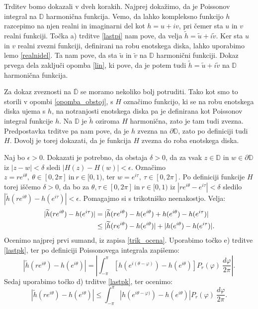\documentclass[mat1]{fmfdelo}
\begin{document}
     \begin{dokaz}
        Trditev bomo dokazali v dveh korakih. Najprej dokažimo, da je Poissonov integral na $\mathbb{D}$ harmonična funkcija.
        Vemo, da lahko kompleksno funkcijo $h$ razcepimo na njen realni in imaginarni del kot $h = u + iv$, pri čemer sta $u$ in $v$ realni funkciji. 
        Točka a) trditve \ref{lastpi} nam pove, da velja $\widetilde{h} = \widetilde{u} + i \widetilde{v}$.
        Ker sta $u$ in $v$ realni zvezni funkciji, definirani na robu enotskega diska, lahko uporabimo lemo \ref{realnidel}. Ta nam pove, da sta $\widetilde{u}$ in $\widetilde{v}$ na $\mathbb{D}$ harmonični funkciji. 
        Dokaz prvega dela zaključi opomba \ref{lin}, ki pove, da je potem tudi $\widetilde{h} = \widetilde{u} + i \widetilde{v}$ na $\mathbb{D}$ harmonična funkcija.
        
        Za dokaz zveznosti na $\overline{\mathbb{D}}$ se moramo nekoliko bolj potruditi. Tako kot smo to storili v opombi \ref{opomba_obstoj}, s $H$ označimo funkcijo, ki se na robu enotskega diska ujema s $h$, na notranjosti enotskega diska pa je definirana kot Poissonov integral funkcije $h$. 
        Na  $\mathbb{D}$ je $\widetilde{h}$ oziroma $H$ harmonična, zato je tam tudi zvezna. Predpostavka trditve pa nam pove, da je $h$ zvezna na $\partial \mathbb{D}$, zato po definiciji tudi $H$. 
        Dovolj je torej dokazati, da je funkcija $H$ zvezna do roba enotskega diska.
        
        Naj bo $\epsilon >0$. Dokazati je potrebno, da obstaja $\delta >0$, da za vsak $z \in \mathbb{D}$ in $w \in \partial \mathbb{D}$ iz $|z - w| < \delta$ sledi $|H(z) - H(w)| < \epsilon$. 
        Označimo $z = r e^{i \theta},~\theta \in [0,2\pi]~\text{in}~r \in [0,1)$, ter $w = e^{i \tau},~\tau \in [0,2\pi]$.
        Po definiciji funkcije $H$ torej iščemo $\delta >0$, da bo za $\theta, \tau \in [0,2\pi]~\text{in}~r \in [0,1)$ iz $|r e^{i \theta} - e^{i\tau}| < \delta$ sledilo $|\widetilde{h}(r e^{i \theta}) - h(e^{i\tau})| < \epsilon$.
        Pomagajmo si s trikotniško neenakostjo. Velja:
        \begin{align}
            \label{trik_ocena}
            |\widetilde{h}(r e^{i \theta}) - h(e^{i\tau})| &= |\widetilde{h}(r e^{i \theta}) - h(e^{i \theta}) + h(e^{i \theta}) - h(e^{i\tau})| \notag \\
            &\leq |\widetilde{h}(r e^{i \theta}) - h(e^{i\theta})| + |h(e^{i\theta}) - h(e^{i\tau})|.
        \end{align}
        Ocenimo najprej prvi sumand, iz zapisa \eqref{trik_ocena}. Uporabimo točko e) trditve \ref{lastpk}, ter po definiciji Poissonovega integrala zapišemo: 
        $$
            \left|\widetilde{h}(r e^{i \theta}) - h(e^{i\theta})\right| = \left|\int_{-\pi}^{\pi}{\left[h\left(e^{i(\theta - \varphi)}\right) - h\left(e^{i\theta}\right)\right]P_r(\varphi)~\frac{d\varphi}{2 \pi}}\right|.
        $$
        Sedaj uporabimo točko d) trditve \ref{lastpk}, ter ocenimo:
        $$
        \left|\widetilde{h}(r e^{i \theta}) - h(e^{i\theta})\right| \leq \int_{-\pi}^{\pi}{\left| h\left(e^{i\theta - \varphi)}\right) - h \left(e^{i\theta}\right) \right|P_r(\varphi)~\frac{d\varphi}{2 \pi}}.
        $$ 


\end{dokaz}
\end{document}
